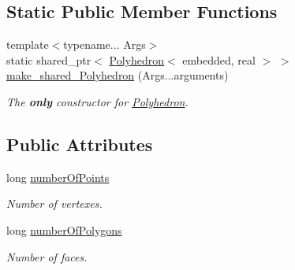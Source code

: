 \subsection*{Static Public Member Functions}
\begin{DoxyCompactItemize}
\item 
{\footnotesize template$<$typename... Args$>$ }\\static shared\+\_\+ptr$<$ \hyperlink{class_polyhedron}{Polyhedron}$<$ embedded, real $>$ $>$ \hyperlink{class_polyhedron_afa6a4455081915cae5bf082f9f0a8cdf}{make\+\_\+shared\+\_\+\+Polyhedron} (Args...\+arguments)
\begin{DoxyCompactList}\small\item\em The {\bfseries only} constructor for \hyperlink{class_polyhedron}{Polyhedron}. \end{DoxyCompactList}\end{DoxyCompactItemize}
\subsection*{Public Attributes}
\begin{DoxyCompactItemize}
\item 
long \hyperlink{class_polyhedron_ac6c8ccc4248cc0bbf64ef77cc412b844}{number\+Of\+Points}\hypertarget{class_polyhedron_ac6c8ccc4248cc0bbf64ef77cc412b844}{}\label{class_polyhedron_ac6c8ccc4248cc0bbf64ef77cc412b844}

\begin{DoxyCompactList}\small\item\em Number of vertexes. \end{DoxyCompactList}\item 
long \hyperlink{class_polyhedron_a6729506f577ffd64dce9cff14738a26d}{number\+Of\+Polygons}\hypertarget{class_polyhedron_a6729506f577ffd64dce9cff14738a26d}{}\label{class_polyhedron_a6729506f577ffd64dce9cff14738a26d}

\begin{DoxyCompactList}\small\item\em Number of faces. \end{DoxyCompactList}\end{DoxyCompactItemize}
